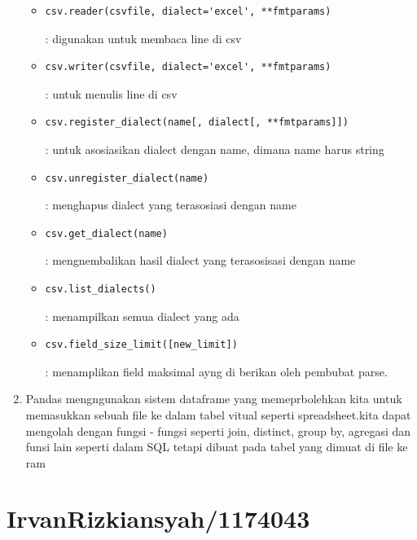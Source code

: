 \begin{enumerate}
\begin{itemize}
			\item \begin{verbatim}csv.reader(csvfile, dialect='excel', **fmtparams)\end{verbatim} : digunakan untuk membaca line di csv
			\item \begin{verbatim}csv.writer(csvfile, dialect='excel', **fmtparams)\end{verbatim} : untuk menulis line di csv
			\item \begin{verbatim}csv.register_dialect(name[, dialect[, **fmtparams]]) \end{verbatim}: untuk asosiasikan dialect dengan name, dimana name harus string
			\item \begin{verbatim}csv.unregister_dialect(name)\end{verbatim} : menghapus dialect yang terasosiasi dengan name
			\item \begin{verbatim}csv.get_dialect(name)\end{verbatim} : mengnembalikan hasil dialect yang terasosisasi dengan name
			\item \begin{verbatim}csv.list_dialects() \end{verbatim}: menampilkan semua dialect yang ada
			\item \begin{verbatim}csv.field_size_limit([new_limit])\end{verbatim} : menamplikan field maksimal ayng di berikan oleh pembubat parse.

		\end{itemize}

	\item Pandas mengngunakan sistem dataframe yang memeprbolehkan kita untuk memasukkan sebuah file ke dalam tabel vitual seperti spreadsheet.kita dapat mengolah dengan fungsi - fungsi  seperti join, distinct, group by, agregasi dan funsi lain seperti dalam SQL tetapi dibuat pada tabel yang dimuat di file ke ram
	\end{enumerate}

\section{IrvanRizkiansyah/1174043}
